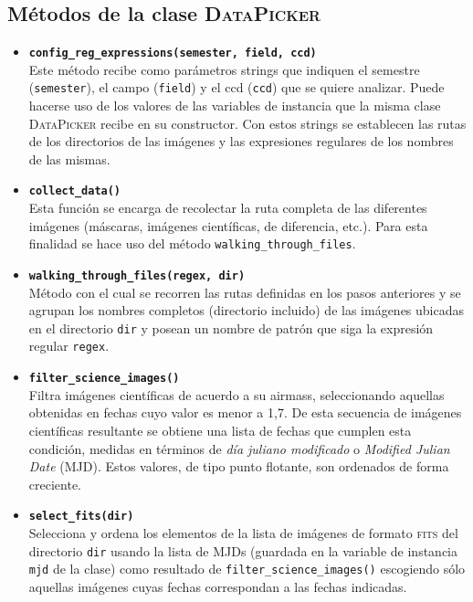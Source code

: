 \begin{appendix}
\section{M\'etodos de la clase \textsc{DataPicker}}
\label{subs:a2}

\begin{itemize}
\item \textbf{\texttt{config\_reg\_expressions(semester, field, ccd)}}\\
Este m\'etodo recibe como par\'ametros strings que indiquen el semestre (\texttt{semester}), el campo (\texttt{field}) y el ccd (\texttt{ccd}) que se quiere analizar. Puede hacerse uso de los valores de las variables de instancia que la misma clase \textsc{DataPicker} recibe en su constructor. Con estos strings se establecen las rutas de los directorios de las im\'agenes y las expresiones regulares de los nombres de las mismas.
\bigskip

\item \textbf{\texttt{collect\_data()}}\\
Esta funci\'on se encarga de recolectar la ruta completa de las diferentes im\'agenes (m\'ascaras, im\'agenes cient\'ificas, de diferencia, etc.). Para esta finalidad se hace uso del m\'etodo \texttt{walking\_through\_files}. 
\bigskip

\item \textbf{\texttt{walking\_through\_files(regex, dir)}}\\
M\'etodo con el cual se recorren las rutas definidas en los pasos anteriores y se agrupan los nombres completos (directorio incluido) de las im\'agenes ubicadas en el directorio \texttt{dir} y posean un nombre de patr\'on que siga la expresi\'on regular \texttt{regex}.
\bigskip

\item \textbf{\texttt{filter\_science\_images()}}\\
Filtra im\'agenes cient\'ificas de acuerdo a su airmass, seleccionando aquellas obtenidas en fechas cuyo valor es menor a 1,7. De esta secuencia de im\'agenes cient\'ificas resultante se obtiene una lista de fechas que cumplen esta condici\'on, medidas en t\'erminos de \textit{d\'ia juliano modificado} o \textit{Modified Julian Date} (MJD). Estos valores, de tipo punto flotante, son ordenados de forma creciente.
\bigskip

\item \textbf{\texttt{select\_fits(dir)}}\\
Selecciona y ordena los elementos de la lista de im\'agenes de formato \textsc{fits} del directorio \texttt{dir} usando la lista de MJDs (guardada en la variable de instancia \texttt{mjd} de la clase) como resultado de \texttt{filter\_science\_images()} escogiendo s\'olo aquellas im\'agenes cuyas fechas correspondan a las fechas indicadas.
\bigskip


\end{itemize}
\end{appendix}
